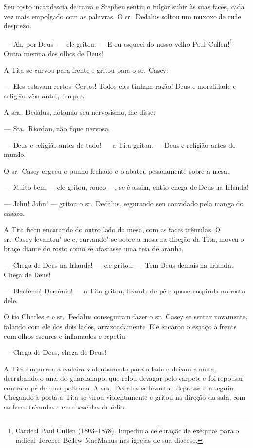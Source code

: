 Seu rosto incandescia de raiva e Stephen sentiu o fulgor subir às suas
faces, cada vez mais empolgado com as palavras. O sr.~Dedalus soltou um
muxoxo de rude desprezo.

 --- Ah, por Deus! --- ele gritou. --- E eu esqueci do nosso velho Paul
Cullen!\footnote{ Cardeal Paul Cullen (1803--1878). Impediu a celebração
de exéquias para o radical Terence Bellew MacManus nas igrejas de sua
diocese.} Outra menina dos olhos de Deus!

A Tita se curvou para frente e gritou para o sr.~Casey:

 --- Eles estavam certos! Certos! Todos eles tinham razão! Deus e
moralidade e religião vêm antes, sempre.

A sra.~Dedalus, notando seu nervosismo, lhe disse:

 --- Sra.~Riordan, não fique nervosa.

 --- Deus e religião antes de tudo! --- a Tita gritou. --- Deus e religião antes do mundo.

O sr.~Casey ergueu o punho fechado e o abateu pesadamente sobre a mesa.

 --- Muito bem --- ele gritou, rouco ---, se é assim, então chega de Deus na Irlanda!

 --- John! John! --- gritou o sr.~Dedalus, segurando seu convidado pela manga do casaco.

A Tita ficou encarando do outro lado da mesa, com as faces trêmulas. O
sr.~Casey levantou"-se e, curvando"-se sobre a mesa na direção
da Tita, moveu o braço diante do rosto como se afastasse uma
teia de aranha.

 --- Chega de Deus na Irlanda! --- ele gritou. --- Tem Deus demais na Irlanda. Chega de Deus!

 --- Blasfemo! Demônio! --- a Tita gritou, ficando de pé e quase cuspindo no rosto dele.

O tio Charles e o sr.~Dedalus conseguiram fazer o sr.~Casey se sentar
novamente, falando com ele dos dois lados, arrazoadamente. Ele encarou
o espaço à frente com olhos escuros e inflamados e repetiu:

 --- Chega de Deus, chega de Deus!

A Tita empurrou a cadeira violentamente para o lado e deixou a mesa,
derrubando o anel do guardanapo, que rolou devagar pelo carpete e foi
repousar contra o pé de uma poltrona. A sra.~Dedalus se levantou
depressa e a seguiu. Chegando à porta a Tita se virou violentamente e
gritou na direção da sala, com as faces trêmulas e enrubescidas de
ódio:

